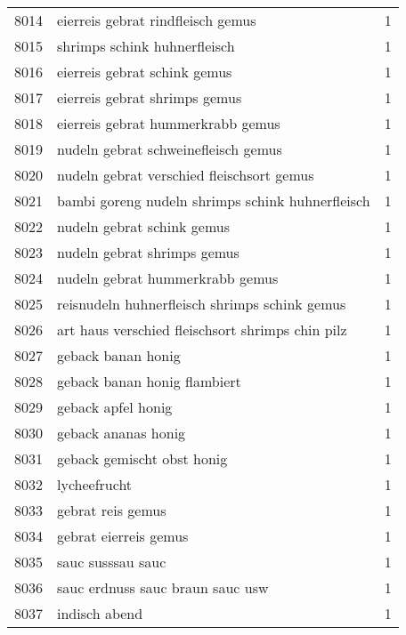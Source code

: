 \begin{tabular}{llr}
8014 &                  eierreis gebrat rindfleisch gemus &      1 \\
8015 &                       shrimps schink huhnerfleisch &      1 \\
8016 &                       eierreis gebrat schink gemus &      1 \\
8017 &                      eierreis gebrat shrimps gemus &      1 \\
8018 &                  eierreis gebrat hummerkrabb gemus &      1 \\
8019 &                nudeln gebrat schweinefleisch gemus &      1 \\
8020 &          nudeln gebrat verschied fleischsort gemus &      1 \\
8021 &   bambi goreng nudeln shrimps schink huhnerfleisch &      1 \\
8022 &                         nudeln gebrat schink gemus &      1 \\
8023 &                        nudeln gebrat shrimps gemus &      1 \\
8024 &                    nudeln gebrat hummerkrabb gemus &      1 \\
8025 &      reisnudeln huhnerfleisch shrimps schink gemus &      1 \\
8026 &   art haus verschied fleischsort shrimps chin pilz &      1 \\
8027 &                                 geback banan honig &      1 \\
8028 &                       geback banan honig flambiert &      1 \\
8029 &                                 geback apfel honig &      1 \\
8030 &                                geback ananas honig &      1 \\
8031 &                         geback gemischt obst honig &      1 \\
8032 &                                       lycheefrucht &      1 \\
8033 &                                  gebrat reis gemus &      1 \\
8034 &                              gebrat eierreis gemus &      1 \\
8035 &                                  sauc susssau sauc &      1 \\
8036 &                   sauc erdnuss sauc braun sauc usw &      1 \\
8037 &                                      indisch abend &      1 \\

\end{tabular}
